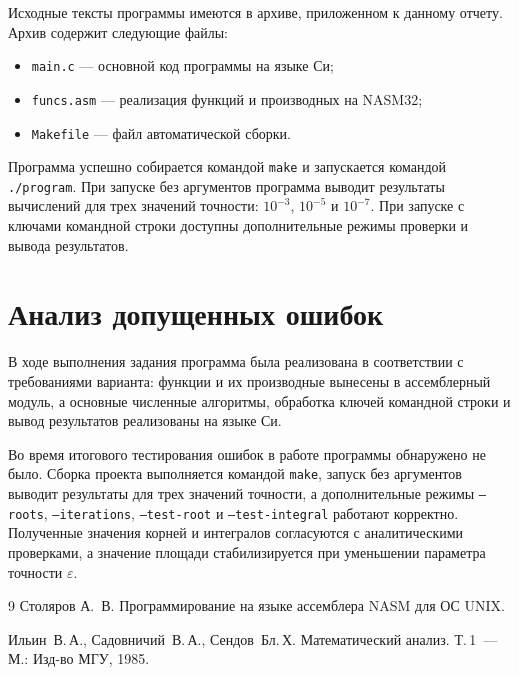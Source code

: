 \documentclass[a4paper,12pt,titlepage,finall]{article}
\begin{document}
Исходные тексты программы имеются в архиве, приложенном к данному отчету. Архив содержит следующие файлы:
\begin{itemize}
    \item \texttt{main.c} --- основной код программы на языке Си;
    \item \texttt{funcs.asm} --- реализация функций и производных на NASM32;
    \item \texttt{Makefile} --- файл автоматической сборки.
\end{itemize}

Программа успешно собирается командой \texttt{make} и запускается командой \texttt{./program}. При запуске без аргументов программа выводит результаты вычислений для трех значений точности: \(10^{-3}\), \(10^{-5}\) и \(10^{-7}\). При запуске с ключами командной строки доступны дополнительные режимы проверки и вывода результатов.


\newpage

\section{Анализ допущенных ошибок}

В ходе выполнения задания программа была реализована в соответствии с требованиями варианта: функции и их производные вынесены в ассемблерный модуль, а основные численные алгоритмы, обработка ключей командной строки и вывод результатов реализованы на языке Си.

Во время итогового тестирования ошибок в работе программы обнаружено не было. Сборка проекта выполняется командой \texttt{make}, запуск без аргументов выводит результаты для трех значений точности, а дополнительные режимы \texttt{--roots}, \texttt{--iterations}, \texttt{--test-root} и \texttt{--test-integral} работают корректно. Полученные значения корней и интегралов согласуются с аналитическими проверками, а значение площади стабилизируется при уменьшении параметра точности \(\varepsilon\).

\newpage

\begin{raggedright}
\begin{thebibliography}{9}
Столяров А.~В. Программирование на языке ассемблера NASM для ОС UNIX.

Ильин~В.\,А., Садовничий~В.\,А., Сендов~Бл.\,Х. Математический анализ. Т.\,1~---М.: Изд-во МГУ, 1985.
\end{thebibliography}
\end{raggedright}
\end{document}
